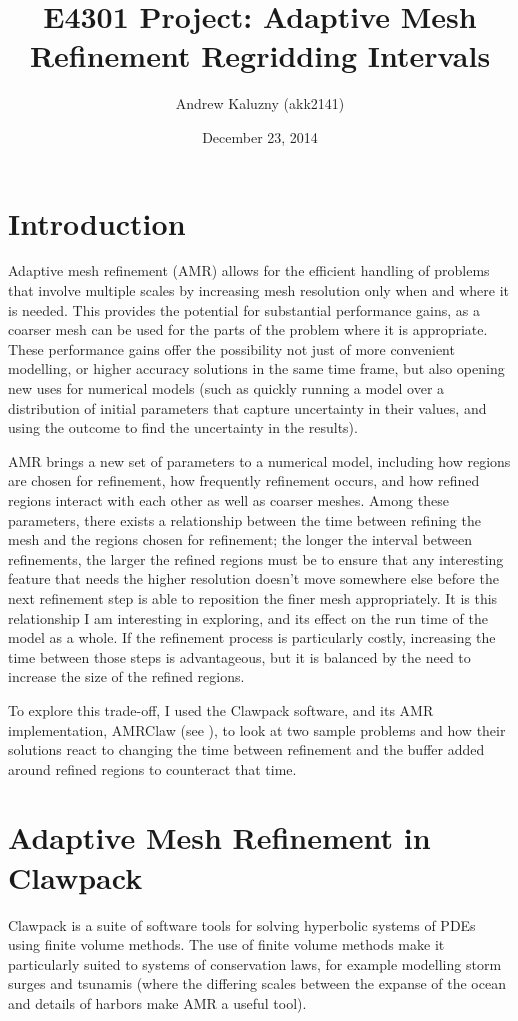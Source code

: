 \documentclass[11pt]{article}
\title{E4301 Project: Adaptive Mesh Refinement Regridding Intervals}
\author{Andrew Kaluzny (akk2141)}
\date{December 23, 2014}
\begin{document}
\maketitle

\section*{Introduction}
Adaptive mesh refinement (AMR) allows for the efficient handling of problems
that involve multiple scales by increasing mesh resolution only when and
where it is needed. This provides the potential for substantial performance
gains, as a coarser mesh can be used for the parts of the problem where it
is appropriate. These performance gains offer the possibility not just of
more convenient modelling, or higher accuracy solutions in the same time
frame, but also opening new uses for numerical models (such as quickly
running a model over a distribution of initial parameters that capture
uncertainty in their values, and using the outcome to find the uncertainty
in the results).

AMR brings a new set of parameters to a numerical model, including how 
regions are chosen for refinement, how frequently refinement occurs,
and how refined regions interact with each other as well as coarser meshes.
Among these parameters, there exists a relationship between the 
time between refining the mesh
and the regions chosen for refinement; the longer the interval between
refinements, the larger the refined regions must be to ensure that any
interesting feature that needs the higher resolution doesn't move somewhere
else before the next refinement step is able to reposition the finer mesh
appropriately. It is this relationship I am interesting in exploring, and
its effect on the run time of the model as a whole. If the refinement process
is particularly costly, increasing the time between those steps is advantageous,
but it is balanced by the need to increase the size of the refined regions.

To explore this trade-off, I used the Clawpack software,
and its AMR implementation, AMRClaw (see \cite{clawpack}), 
to look at two sample problems and how
their solutions react to changing the time between refinement and the buffer
added around refined regions to counteract that time.

\section*{Adaptive Mesh Refinement in Clawpack}
Clawpack is a suite of software tools for solving hyperbolic systems of
PDEs using finite volume methods. The use of finite volume methods make it
particularly suited to systems of conservation laws, for example modelling storm surges and tsunamis (where the differing scales 
between the expanse of the ocean and details of harbors make AMR a useful
tool).
\end{document}

